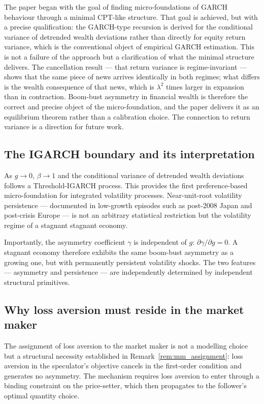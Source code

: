 \documentclass[12pt,a4paper]{article}
\theoremstyle{definition}
\begin{document}
The paper began with the goal of finding micro-foundations of GARCH
behaviour through a minimal CPT-like structure. That goal is achieved, but
with a precise qualification: the GARCH-type recursion is derived for
the conditional variance of detrended wealth deviations rather than
directly for equity return variance, which is the conventional object of
empirical GARCH estimation. This is not a failure of the approach but a
clarification of what the minimal structure delivers. The cancellation
result --- that return variance is regime-invariant --- shows that the
same piece of news arrives identically in both regimes; what differs is
the wealth consequence of that news, which is $\lambda^2$ times larger in
expansion than in contraction. Boom-bust asymmetry in financial wealth is
therefore the correct and precise object of the micro-foundation, and the
paper delivers it as an equilibrium theorem rather than a calibration
choice. The connection to return variance is a direction for future work.

\subsection{The IGARCH boundary and its interpretation}
\label{sec:igarch}

As $g \to 0$, $\beta \to 1$ and the conditional variance of detrended
wealth deviations follows a Threshold-IGARCH process. This provides the
first preference-based micro-foundation for integrated volatility
processes. Near-unit-root volatility persistence --- documented in
low-growth episodes such as post-2008 Japan and post-crisis Europe ---
is not an arbitrary statistical restriction but the volatility regime of
a stagnant stagnant economy.

Importantly, the asymmetry coefficient $\gamma$ is independent of $g$:
$\partial\gamma/\partial g = 0$. A stagnant economy therefore exhibits
the same boom-bust asymmetry as a growing one, but with permanently
persistent volatility shocks. The two features --- asymmetry and
persistence --- are independently determined by independent structural
primitives.

\subsection{Why loss aversion must reside in the market maker}
\label{sec:why_mm}

The assignment of loss aversion to the market maker is not a modelling
choice but a structural necessity established in
Remark~\ref{rem:mm_assignment}: loss aversion in the speculator's
objective cancels in the first-order condition and generates no
asymmetry. The mechanism requires loss aversion to enter through a
binding constraint on the price-setter, which then propagates to the
follower's optimal quantity choice.
\end{document}
